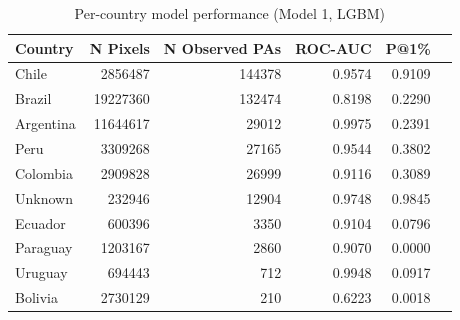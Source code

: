 \begin{table}[h]
\centering
\begin{tabular}{lrrrrr}
\toprule
Country & N Pixels & N Observed PAs & ROC-AUC & P@1\% \\
\midrule
Chile & 2856487 & 144378 & 0.9574 & 0.9109 \\
Brazil & 19227360 & 132474 & 0.8198 & 0.2290 \\
Argentina & 11644617 & 29012 & 0.9975 & 0.2391 \\
Peru & 3309268 & 27165 & 0.9544 & 0.3802 \\
Colombia & 2909828 & 26999 & 0.9116 & 0.3089 \\
Unknown & 232946 & 12904 & 0.9748 & 0.9845 \\
Ecuador & 600396 & 3350 & 0.9104 & 0.0796 \\
Paraguay & 1203167 & 2860 & 0.9070 & 0.0000 \\
Uruguay & 694443 & 712 & 0.9948 & 0.0917 \\
Bolivia & 2730129 & 210 & 0.6223 & 0.0018 \\
\bottomrule
\end{tabular}
\caption{Per-country model performance (Model 1, LGBM)}
\label{tab:country_breakdown_lgbm}
\end{table}
